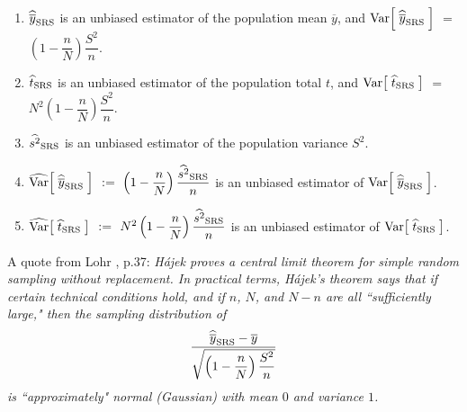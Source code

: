 \documentclass{article}
\begin{document}
\begin{proposition}\label{SRS:unbiased:estimators}\quad
\begin{enumerate}
\item  $\widehat{\overline{y}}_{\textnormal{SRS}}$ is an unbiased estimator of the population mean $\overline{y}$, and
          $\textnormal{Var}\!\left[\;\widehat{\overline{y}}_{\textnormal{SRS}}\;\right]$ $=$ $\left(1-\dfrac{n}{N}\right)\dfrac{S^{2}}{n}$.
\item  $\widehat{t}_{\textnormal{SRS}}$ is an unbiased estimator of the population total $t$, and
          $\textnormal{Var}\!\left[\;\widehat{t}_{\textnormal{SRS}}\;\right]$ $=$ $N^{2}\left(1-\dfrac{n}{N}\right)\dfrac{S^{2}}{n}$.
\item  $\widehat{s^{2}}_{\textnormal{SRS}}$ is an unbiased estimator of the population variance $S^{2}$.
\item  $\widehat{\textnormal{Var}}\!\left[\;\widehat{\overline{y}}_{\textnormal{SRS}}\;\right]$
          $:=$ $\left(1-\dfrac{n}{N}\right)\dfrac{\widehat{s^{2}}_{\textnormal{SRS}}}{n}$
          is an unbiased estimator of $\textnormal{Var}\!\left[\;\widehat{\overline{y}}_{\textnormal{SRS}}\;\right]$.
\item  $\widehat{\textnormal{Var}}\!\left[\;\widehat{t}_{\textnormal{SRS}}\;\right]$
          $:=$ $N^{2}\left(1-\dfrac{n}{N}\right)\dfrac{\widehat{s^{2}}_{\textnormal{SRS}}}{n}$
          is an unbiased estimator of $\textnormal{Var}\!\left[\;\widehat{t}_{\textnormal{SRS}}\;\right]$.
\end{enumerate}
\end{proposition}

\noindent
A quote from Lohr \cite{Lohr1999}, p.37:
\emph{
H\'{a}jek \cite{Hajek1960} proves a central limit theorem for simple random sampling without replacement.  In practical terms, H\'{a}jek's theorem says that if certain technical conditions hold, and if $n$, $N$, and $N-n$ are all ``sufficiently large," then the sampling distribution of
\begin{equation*}
    \dfrac{\widehat{\overline{y}}_{\textnormal{SRS}}-\overline{y}}{\sqrt{\left(1-\dfrac{n}{N}\right)\dfrac{S^{2}}{n}}}
\end{equation*}
is ``approximately" normal (Gaussian) with mean $0$ and variance $1$.
}
\end{document}

